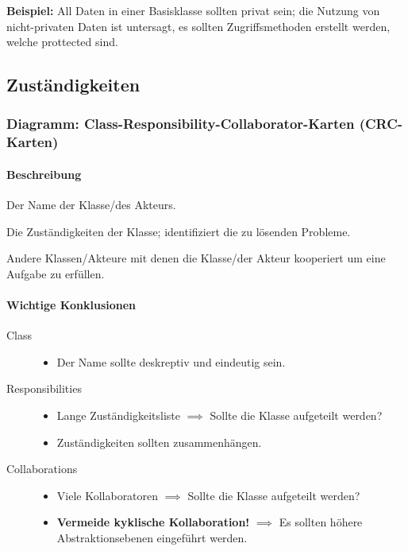 		\textbf{Beispiel:} All Daten in einer Basisklasse sollten privat sein; die Nutzung von nicht-privaten Daten ist untersagt, es sollten Zugriffsmethoden erstellt werden, welche prottected sind.

		\subsection{Zuständigkeiten}
			\subsubsection{Diagramm: Class-Responsibility-Collaborator-Karten (CRC-Karten)}
				\label{diagram:crc}

				\paragraph{Beschreibung}
					\begin{description}[leftmargin = 3cm]
						\item[Class] Der Name der Klasse/des Akteurs.
						\item[Responsibilities] Die Zuständigkeiten der Klasse; identifiziert die zu lösenden Probleme.
						\item[Collaborations] Andere Klassen/Akteure mit denen die Klasse/der Akteur kooperiert um eine Aufgabe zu erfüllen.
					\end{description}


				\paragraph{Wichtige Konklusionen}
					\begin{description}
						\item[Class]
							\begin{itemize}
								\item Der Name sollte deskreptiv und eindeutig sein.
							\end{itemize}
						\item[Responsibilities]
							\begin{itemize}
								\item Lange Zuständigkeitsliste  $ \implies $ Sollte die Klasse aufgeteilt werden?
								\item Zuständigkeiten sollten zusammenhängen.
							\end{itemize}
						\item[Collaborations]
							\begin{itemize}
								\item Viele Kollaboratoren $ \implies $ Sollte die Klasse aufgeteilt werden?
								\item \textbf{Vermeide kyklische Kollaboration!} $ \implies $ Es sollten höhere Abstraktionsebenen eingeführt werden.
							\end{itemize}
					\end{description}

